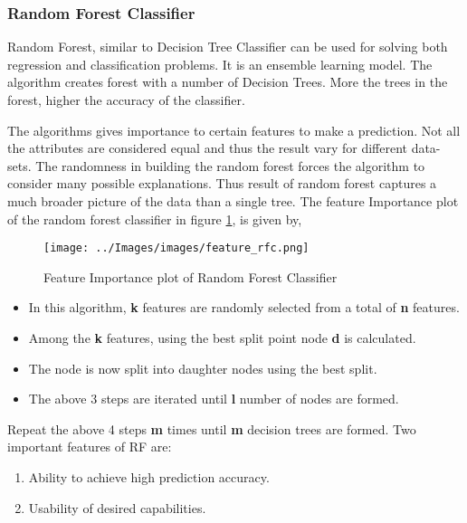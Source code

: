 \documentclass[conference]{IEEEtran}
\begin{document}
\subsubsection*{Random Forest Classifier}
Random Forest, similar to Decision Tree Classifier can be used for solving both regression and classification problems. It is an ensemble learning model. \cite{rf}  The algorithm creates forest with a number of Decision Trees. More the trees in the forest, higher the accuracy of the classifier. 
\par

The algorithms gives importance to certain features to make a prediction. Not all the attributes are considered equal and thus the result vary for different data-sets. The randomness in building the random forest forces the algorithm to consider many possible explanations. Thus result of random forest captures a much broader picture of the data than a single tree. The feature Importance plot of the random forest classifier in figure \ref{rfc}, is given by, 
%
\begin{figure}[ht!]
	\centering
	\texttt{[image: ../Images/images/feature\_rfc.png]}
    \caption{Feature Importance plot of Random Forest Classifier}	
	\label{rfc}
\end{figure}
\par
\begin{itemize}
\item In this algorithm, \textbf{k} features are randomly selected from a total of \textbf{n} features.
\item Among the \textbf{k} features, using the best split point node \textbf{d} is calculated.
\item The node is now split into daughter nodes using the best split.
\item The above 3 steps are iterated until \textbf{l} number of nodes are formed.
\end{itemize}
Repeat the above 4 steps \textbf{m} times until \textbf{m} decision trees are formed. Two important features of RF are: 
\begin{enumerate}
\item Ability to achieve high prediction accuracy.
\item Usability of desired capabilities.
\end{enumerate}
\end{document}

